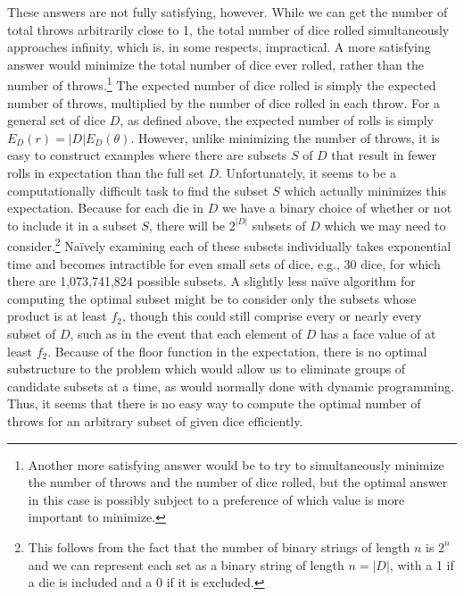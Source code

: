 \documentclass{article}
\begin{document}
\par These answers are not fully satisfying, however.
While we can get the number of total throws arbitrarily close to 1, the total number of dice rolled simultaneously approaches infinity, which is, in some respects, impractical.
A more satisfying answer would minimize the total number of dice ever rolled, rather than the number of throws.\footnote{Another more satisfying answer would be to try to simultaneously minimize the number of throws and the number of dice rolled, but the optimal answer in this case is possibly subject to a preference of which value is more important to minimize.}
The expected number of dice rolled is simply the expected number of throws, multiplied by the number of dice rolled in each throw.
For a general set of dice $D$, as defined above, the expected number of rolls is simply $E_D(r)=|D|E_D(\theta)$.
However, unlike minimizing the number of throws, it is easy to construct examples where there are subsets $S$ of $D$ that result in fewer rolls in expectation than the full set $D$.
Unfortunately, it seems to be a computationally difficult task to find the subset $S$ which actually minimizes this expectation.
Because for each die in $D$ we have a binary choice of whether or not to include it in a subset $S$, there will be $2^{|D|}$ subsets of $D$ which we may need to consider.\footnote{This follows from the fact that the number of binary strings of length $n$ is $2^n$ and we can represent each set as a binary string of length $n=|D|$, with a 1 if a die is included and a 0 if it is excluded.}
Na\"ively examining each of these subsets individually takes exponential time and becomes intractible for even small sets of dice, e.g., 30 dice, for which there are 1,073,741,824 possible subsets.
A slightly less na\"ive algorithm for computing the optimal subset might be to consider only the subsets whose product is at least $f_2$, though this could still comprise every or nearly every subset of $D$, such as in the event that each element of $D$ has a face value of at least $f_2$.
Because of the floor function in the expectation, there is no optimal substructure to the problem which would allow us to eliminate groups of candidate subsets at a time, as would normally done with dynamic programming.
Thus, it seems that there is no easy way to compute the optimal number of throws for an arbitrary subset of given dice efficiently.
\end{document}

